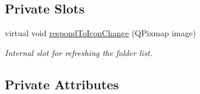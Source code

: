 \subsection*{Private Slots}
\begin{DoxyCompactItemize}
\item 
virtual void \hyperlink{class_u_i_1_1_folder_browser_add24619b5ba870b49505a4d0254c1c68}{respond\-To\-Icon\-Change} (Q\-Pixmap image)
\begin{DoxyCompactList}\small\item\em Internal slot for refreshing the folder list. \end{DoxyCompactList}\end{DoxyCompactItemize}
\subsection*{Private Attributes}
